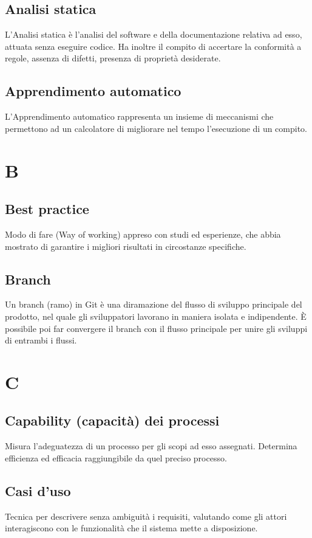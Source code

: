 	\subsection{Analisi statica}
	L'Analisi statica è l'analisi del software e della documentazione relativa ad esso, attuata senza eseguire codice. Ha inoltre il compito di accertare la conformità a regole, assenza di difetti, presenza di proprietà desiderate.
	
	\subsection{Apprendimento automatico}
	L'Apprendimento automatico rappresenta un insieme di meccanismi che permettono ad un calcolatore di migliorare nel tempo l'esecuzione di un compito. 
	
	\section{B}
	\subsection{Best practice} 
	Modo di fare (Way of working) appreso con studi ed esperienze, che abbia mostrato di garantire i migliori risultati in circostanze specifiche.
	
	\subsection{Branch} 
	Un branch (ramo) in Git è una diramazione del flusso di sviluppo principale del prodotto, nel quale gli sviluppatori lavorano in maniera isolata e indipendente. \`E possibile poi far convergere il branch con il flusso principale per unire gli sviluppi di entrambi i flussi.
	
	\section{C}
	\subsection{Capability (capacità) dei processi}
	Misura l'adeguatezza di un processo per gli scopi ad esso assegnati. Determina efficienza ed efficacia raggiungibile da quel preciso processo.
	
	\subsection{Casi d'uso}
	Tecnica per descrivere senza ambiguità i requisiti, valutando come gli attori interagiscono con le funzionalità che il sistema mette a disposizione.
		
